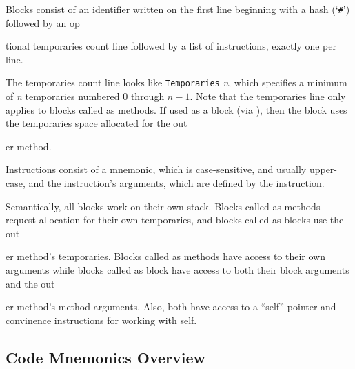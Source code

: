 \documentclass[letterpaper,12pt]{article}
\newcommand{\code}[1]{\texttt{#1}}
\renewcommand{\arg}[1]{\textit{#1}}
\newcommand{\sblk}{\code{\#}}
\begin{document}
Blocks consist of an identifier written on the first line beginning with
a hash (`\sblk') followed by an op{tional temporaries count line
followed by a list of instructions, exactly one per line.

The temporaries count line looks like \code{Temporaries} \arg{n}, which
specifies a minimum of \arg{n} temporaries numbered 0 through $n-1$.
Note that the temporaries line only applies to blocks called as methods.
If used as a block (via ), then the block uses the temporaries
space allocated for the out{er method.

Instructions consist of a mnemonic, which is case-sensitive, and usually
upper-case, and the instruction's arguments, which are defined by the
instruction.

Semantically, all blocks work on their own stack. Blocks called as methods
request allocation for their own temporaries, and blocks called as blocks
use the out{er method's temporaries. Blocks called as methods have access to
their own arguments while blocks called as block have access
to both their block arguments and the out{er method's method arguments.
Also, both have access to a ``self'' pointer and convinence instructions for
working with self.

\subsection{Code Mnemonics Overview}

}}}}
\end{document}

